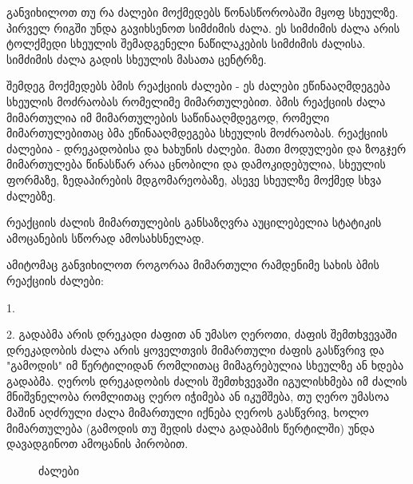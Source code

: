 \documentclass{book}
\begin{document}
განვიხილოთ თუ რა ძალები მოქმედებს წონასწორობაში მყოფ სხეულზე. პირველ რიგში უნდა გავიხსენოთ სიმძიმის ძალა. ეს სიმძიმის ძალა არის ტოლქმედი სხეულის შემადგენელი ნაწილაკების სიმძიმის ძალისა. სიმძიმის ძალა გადის სხეულის მასათა ცენტრზე. 
	
შემდეგ მოქმედებს ბმის რეაქციის ძალები - ეს ძალები ეწინააღმდეგება სხეულის მოძრაობას რომელიმე მიმართულებით. ბმის რეაქციის ძალა მიმართულია იმ მიმართულების საწინააღმდეგოდ, რომელი მიმართულებითაც ბმა ეწინააღმდეგება სხეულის მოძრაობას. რეაქციის ძალებია - დრეკადობისა და ხახუნის ძალები. მათი მოდულები და ზოგჯერ მიმართულება წინასწარ არაა ცნობილი და დამოკიდებულია, სხეულის ფორმაზე, ზედაპირების მდგომარეობაზე, ასევე სხეულზე მოქმედ სხვა ძალებზე.
	
რეაქციის ძალის მიმართულების განსაზღვრა აუცილებელია სტატიკის ამოცანების სწორად ამოსახსნელად.	

ამიტომაც განვიხილოთ როგორაა მიმართული რამდენიმე სახის ბმის რეაქციის ძალები:
	
1. 
	
2. გადაბმა არის დრეკადი ძაფით ან უმასო ღეროთი, ძაფის შემთხვევაში დრეკადობის ძალა არის ყოველთვის მიმართული ძაფის გასწვრივ და "გამოდის" იმ წერტილიდან რომლითაც მიმაგრებულია სხეულზე ან ხდება გადაბმა. ღეროს დრეკადობის ძალის შემთხვევაში იგულისხმება იმ ძალის მნიშვნელობა რომლითაც ღერო იჭიმება ან იკუმშება, თუ ღერო უმასოა მაშინ აღძრული ძალა მიმართული იქნება ღეროს გასწვრივ, ხოლო მიმართულება (გამოდის თუ შედის ძალა გადაბმის წერტილში) უნდა დავადგინოთ ამოცანის პირობით.
		\begin{figure}[H]%
   			 \centering
    		\qquad
   	 		\caption{ძალები}%
    	\label{fig:example}%
		\end{figure}	 
	 
\end{document}
